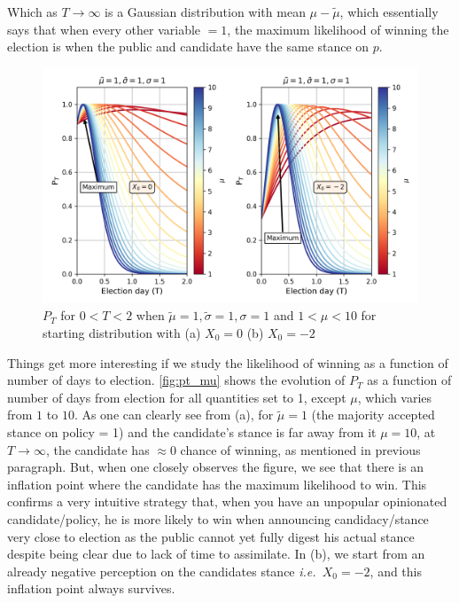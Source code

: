 \documentclass[aps,prl,twocolumn,showpacs,final]{revtex4-2}
\newcommand{\ie}{\textit{i.e.\ }}
\begin{document}
Which as $T\rightarrow \infty$ is a Gaussian distribution with mean $\mu-\tilde{\mu}$, which essentially says that when every other variable $=1$, the maximum likelihood of winning the election is when the public and candidate have the same stance on $p$.

\begin{figure}[htbp]
\includegraphics[width=\columnwidth]{figs/pt_mu.png}
\caption{ $P_T$ for $0<T<2$ when $\tilde{\mu}=1,\tilde{\sigma}=1,\sigma=1$ and $1<\mu<10$ for starting distribution with (a) $X_0=0$ (b) $X_0=-2$ }
\label{fig:pt_mu}
\end{figure}

Things get more interesting if we study the likelihood of winning as a function of number of days to election. \autoref{fig:pt_mu} shows the evolution of $P_T$ as a function of number of days from election for all quantities set to 1, except $\mu$, which varies from $1$ to $10$. As one can clearly see from (a), for $\tilde{\mu}=1$ (the majority accepted stance on policy = 1) and the candidate's stance is far away from it $\mu=10$, at $T\rightarrow\infty$, the candidate has $\approx0$ chance of winning, as mentioned in previous paragraph. But, when one closely observes the figure, we see that there is an inflation point where the candidate has the maximum likelihood to win. This confirms a very intuitive strategy that, when you have an unpopular opinionated candidate/policy, he is more likely to win when announcing candidacy/stance very close to election as the public cannot yet fully digest his actual stance despite being clear due to lack of time to assimilate. In (b), we start from an already negative perception on the candidates stance \ie $X_0=-2$, and this inflation point always survives.
\end{document}
